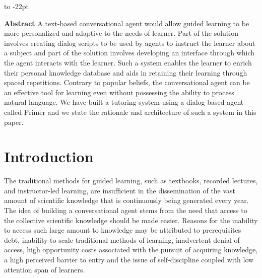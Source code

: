 \documentclass[]{article}
\makeatletter
\def\author#1{\gdef\@author{\hskip-\dimexpr(\tabcolsep)\hskip1pt\parbox{\dimexpr\textwidth-1pt}{\bfseries\raggedright \textit{#1}}}}
\def\title#1{\gdef\@title{\raggedright\bfseries\def\baselinestretch{1}\selectfont\selectfont#1}}
\renewenvironment{abstract}
{\hspace*{-15pc}\vspace*{-9.3pc}\vbox to -22pt \bgroup\begin{minipage}{1.7in}{\fontsize{8}{10}\selectfont\addtocontents{toc}{\protect\setcounter{tocdepth}{-1}}\tableofcontents\addtocontents{toc}{\protect\setcounter{tocdepth}{2}}}\vspace{1cm}\end{minipage}\egroup\vspace*{-.4pc}\trivlist\item[]\leftskip1pt\hfill\hfill\mbox{\null}\par\noindent\ignorespaces\color{black} }{\par\noindent\endtrivlist}
\makeatother
\begin{document}
\def\authorCount{0}
\def\affCount{0}

\def\journalTitle{White Paper- Primerlabs}

\title{An incremental approach for building an intelligent tutoring system using a dialog based agent}
\author{Siddharth Kanungo}


\maketitle 
\def\RunningTitle{{An incremental approach for building an intelligent tutoring system using a dialog based agent}}
\begin{abstract}
  \textbf{Abstract}
  A text-based conversational agent would allow guided learning to be more personalized and adaptive to the needs of learner. Part of the solution involves creating dialog scripts to be used by agents to instruct the learner about a subject and part of the solution involves developing an interface through which the agent interacts with the learner. Such a system enables the learner to enrich their personal knowledge database and aids in retaining their learning through spaced repetitions. Contrary to popular beliefs, the conversational agent can be an effective tool for learning even without possessing the ability to process natural language. We have built a tutoring system using a dialog based agent called Primer and we state the rationale and architecture of such a system in this paper. 
\end{abstract}
    
\section{Introduction}
The traditional methods for guided learning, such as textbooks, recorded lectures, and instructor-led learning, are insufficient in the dissemination of the vast amount of scientific knowledge that is continuously being generated every year. The idea of building a conversational agent stems from the need that access to the collective scientific knowledge should be made easier. Reasons for the inability to access such large amount to knowledge may be attributed to prerequisites debt, inability to scale traditional methods of learning, inadvertent denial of access, high opportunity costs associated with the pursuit of acquiring knowledge, a high perceived barrier to entry and the issue of self-discipline coupled with low attention span of learners. 
\end{document}
